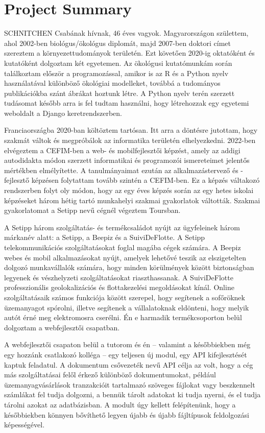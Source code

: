 \chapter{Project Summary}\label{ch:project-summary}


SCHNITCHEN Csabának hívnak, 46 éves vagyok. Magyarországon születtem, ahol 2002-ben biológus/ökológus diplomát, majd 2007-ben doktori címet szereztem a környezettudományok területén. Ezt követően 2020-ig oktatóként és kutatóként dolgoztam két egyetemen. Az ökológusi kutatómunkám során találkoztam először a programozással, amikor is az R és a Python nyelv használatával különböző ökológiai modelleket, továbbá a tudományos publikációkba szánt ábrákat hoztunk létre. A Python nyelv terén szerzett tudásomat később arra is fel tudtam használni, hogy létrehozzak egy egyetemi weboldalt a Django keretrendszerben.

Franciaországba 2020-ban költöztem tartósan. Itt arra a döntésre jutottam, hogy szakmát váltok és megpróbálok az informatika területén elhelyezkedni. 2022-ben elvégeztem a CEFIM-ben a web- és mobilfejlesztői képzést, amely az addigi autodidakta módon szerzett informatikai és programozói ismereteimet jelentős mértékben elmélyítette. A tanulmányaimat ezután az alkalmazástervező és -fejlesztő képzésen folytattam tovább szintén a CEFIM-ben. Ez a képzés váltakozó rendszerben folyt oly módon, hogy az egy éves képzés során az egy hetes iskolai képzéseket három hétig tartó munkahelyi szakmai gyakorlatok váltották. Szakmai gyakorlatomat a Setipp nevű cégnél végeztem Toursban.

A Setipp három szolgáltatás- és termékcsaládot nyújt az ügyfeleinek három márkanév alatt: a Setipp, a Beepiz és a SuiviDeFlotte. A Setipp telekommunikációs szolgáltatásokat foglal magába cégek számára. A Beepiz webes és mobil alkalmazásokat nyújt, amelyek lehetővé teszik az elszigetelten dolgozó munkavállalók számára, hogy minden körülmények között biztonságban legyenek és vészhelyzeti szolgáltatásokat riaszthassanak. A SuiviDeFlotte professzionális geolokalizációs és flottakezelési megoldásokat kínál. Online szolgáltatásaik számos funkciója között szerepel, hogy segítenek a sofőröknek üzemanyagot spórolni, illetve segítenek a vállalatoknak eldönteni, hogy melyik autót érné meg elektromosra cserélni. Én e harmadik termékcsoporton belül dolgoztam a webfejlesztői csapatban.

A webfejlesztői csapaton belül a tutorom és én -- valamint a későbbiekben még egy hozzánk csatlakozó kolléga -- egy teljesen új modul, egy API kifejlesztését kaptuk feladatul. A dokumentum csővezeték nevű API célja az volt, hogy a cég más szolgáltatásai felől érkező különböző dokumentumokat, például üzemanyagvásárlások tranzakcióit tartalmazó szöveges fájlokat vagy beszkennelt számlákat fel tudja dolgozni, a bennük tárolt adatokat ki tudja nyerni, és el tudja tárolni azokat az adatbázisban. A modult úgy kellett felépítenünk, hogy a későbbiekben könnyen bővíthető legyen újabb és újabb fájltípusok feldolgozási képességével.


